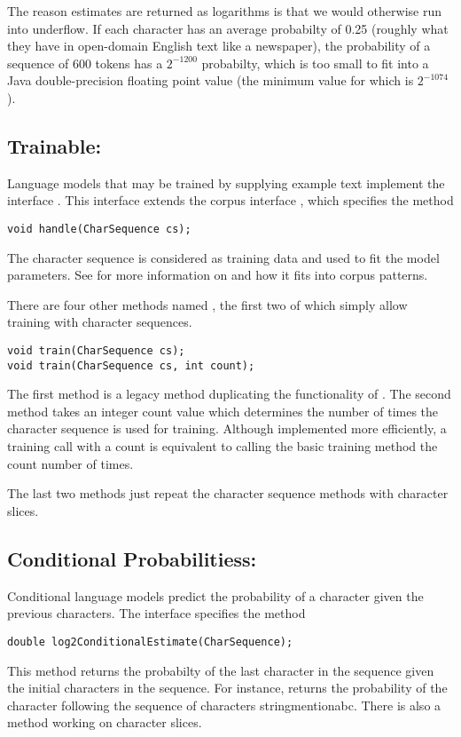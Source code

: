 The reason estimates are returned as logarithms is that we would
otherwise run into underflow.  If each character has an average
probabilty of 0.25 (roughly what they have in open-domain English text
like a newspaper), the probability of a sequence of 600 tokens has a
$2^{-1200}$ probabilty, which is too small to fit into a Java
double-precision floating point value (the minimum value for which is
$2^{-1074}$).

\subsection{Trainable: }

Language models that may be trained by supplying example text
implement the interface .  This interface
extends the corpus interface ,
which specifies the method
%
\begin{verbatim}
void handle(CharSequence cs);
\end{verbatim}
%
The character sequence is considered as training data and used to fit
the model parameters.  See  for more
information on  and how it fits into corpus
patterns.

There are four other methods named , the first two
of which simply allow training with character sequences.
%
\begin{verbatim}
void train(CharSequence cs);
void train(CharSequence cs, int count);
\end{verbatim}
%
The first method is a legacy method duplicating the functionality of
.  The second method takes an integer count value which
determines the number of times the character sequence is used for
training.  Although implemented more efficiently, a training call
with a count is equivalent to calling the basic training method the
count number of times.

The last two methods just repeat the character sequence methods
with character slices.


\subsection{Conditional Probabilitiess: }

Conditional language models predict the probability of a character
given the previous characters.  The interface
 specifies the method
%
\begin{verbatim}
double log2ConditionalEstimate(CharSequence);
\end{verbatim}
%
This method returns the probabilty of the last character in
the sequence given the initial characters in the sequence.  For
instance,  returns the
probability of the character  following the
sequence of characters stringmention{abc}.  There is also
a method working on character slices.


